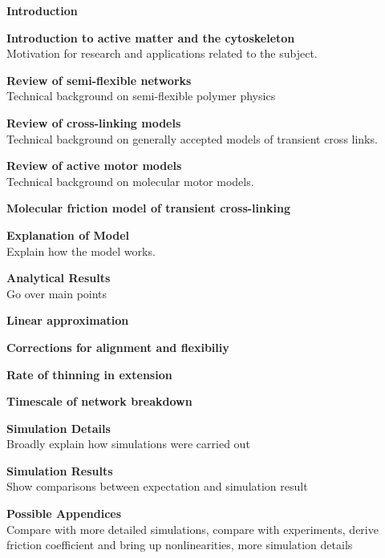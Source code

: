 \documentclass{report}
\begin{document}
\begin{outline}
  \item {\bf Introduction }
  \begin{outline}
    \item {\bf Introduction to active matter and the cytoskeleton} \\
      Motivation for research and applications related to the
      subject.
    \item {\bf Review of semi-flexible networks } \\
      Technical background on semi-flexible polymer physics
    \item {\bf Review of cross-linking models } \\
      Technical background on generally accepted models of transient cross links.
    \item {\bf Review of active motor models } \\
      Technical background on molecular motor models.
  \end{outline}
  \item {\bf Molecular friction model of transient cross-linking}
  \begin{outline}
    \item {\bf Explanation of Model } \\
      Explain how the model works.
    \item {\bf Analytical Results } \\
      Go over main points
    \begin{outline}
      \item {\bf Linear approximation }
      \item {\bf Corrections for alignment and flexibiliy }
      \item {\bf Rate of thinning in extension }
      \item {\bf Timescale of network breakdown }
    \end{outline}
    \item {\bf Simulation Details } \\
      Broadly explain how simulations were carried out
    \item {\bf Simulation Results } \\
      Show comparisons between expectation and simulation result
    \item {\bf Possible Appendices } \\
      Compare with more detailed simulations, compare with experiments, derive friction coefficient and bring up nonlinearities, more simulation details

\end{outline}
\end{outline}
\end{document}
